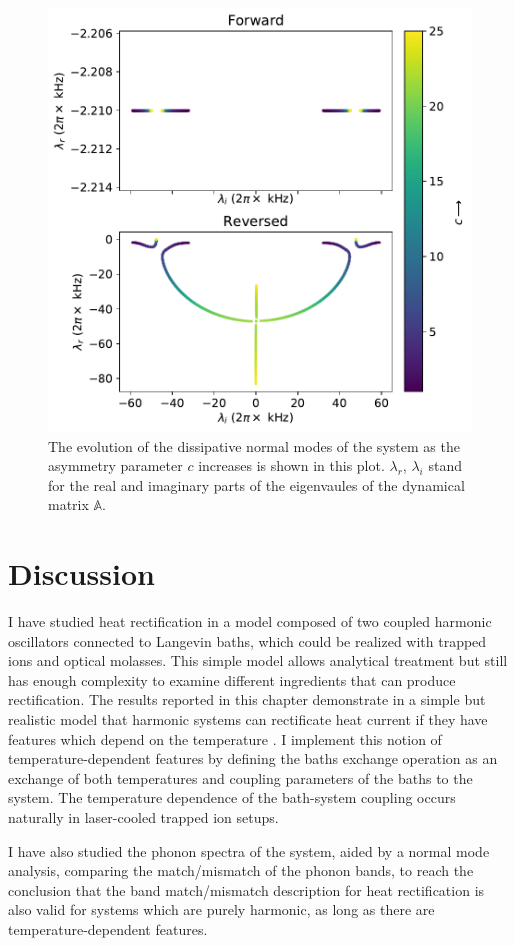 \begin{figure}
  \center
  \includegraphics[width=0.75\linewidth]{Figures/Eigenvals_NormalModes.pdf}
  \caption{The evolution of the dissipative normal modes of the system as the asymmetry parameter $c$ increases is shown in this plot. $\lambda_r$, $\lambda_i$ stand for the real and imaginary parts of the eigenvaules of the dynamical matrix $\mathbb{A}$.}
  \label{fig:Figure_Eigenvals_NormalModes}
\end{figure}


%
\section{Discussion \label{sec:chapter6_Discussion}}
%
I have studied heat rectification in a model composed of two coupled harmonic oscillators connected to Langevin baths, which could be realized with trapped ions and optical molasses. This simple model allows analytical treatment but still has enough complexity to examine different ingredients that can produce rectification. The results reported in this chapter demonstrate in a simple but realistic model that harmonic systems can rectificate heat current if they have features which depend on the temperature  \cite{Pereira2017}. I implement this notion of temperature-dependent features by defining the baths exchange operation as an exchange of both temperatures and coupling parameters of the baths to the system. The temperature dependence of the bath-system coupling  occurs naturally in laser-cooled trapped ion setups.

I have also studied the phonon spectra of the system, aided by a normal mode analysis,
comparing the match/mismatch of the phonon bands, to reach the conclusion that the band match/mismatch description for heat rectification is also valid for systems which are purely harmonic, as long as there are temperature-dependent features.

